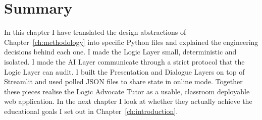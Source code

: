 \section{Summary}
In this chapter I have translated the design abstractions of Chapter~\ref{ch:methodology} into specific Python files and explained the engineering decisions behind each one. I made the Logic Layer small, deterministic and isolated. I made the AI Layer communicate through a strict protocol that the Logic Layer can audit. I built the Presentation and Dialogue Layers on top of Streamlit and used polled JSON files to share state in online mode. Together these pieces realise the Logic Advocate Tutor as a usable, classroom deployable web application. In the next chapter I look at whether they actually achieve the educational goals I set out in Chapter~\ref{ch:introduction}.
